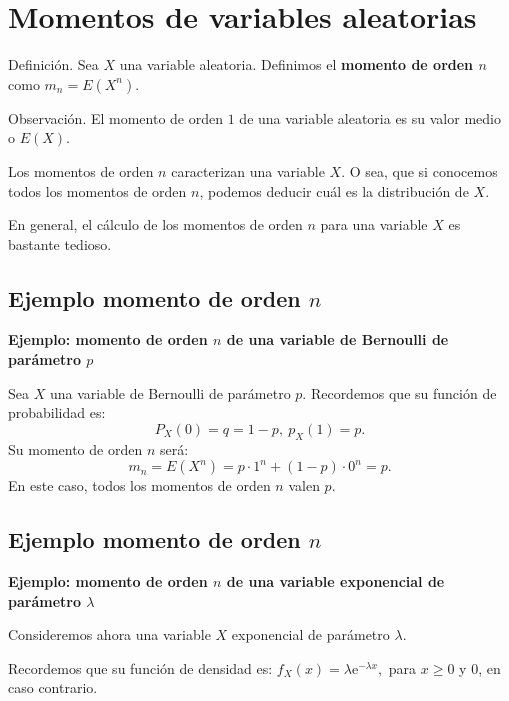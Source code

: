 \documentclass[]{book}
\begin{document}
\hypertarget{momentos-de-variables-aleatorias}{%
\section{Momentos de variables aleatorias}\label{momentos-de-variables-aleatorias}}

 Definición.
Sea \(X\) una variable aleatoria. Definimos el \textbf{momento de orden \(n\)} como
\(m_n = E\left(X^n\right)\).

 Observación.
El momento de orden \(1\) de una variable aleatoria es su valor medio o \(E(X)\).

Los momentos de orden \(n\) caracterizan una variable \(X\). O sea, que si conocemos todos los momentos de orden \(n\), podemos deducir cuál es la distribución de \(X\).

En general, el cálculo de los momentos de orden \(n\) para una variable \(X\) es bastante tedioso.

\hypertarget{ejemplo-momento-de-orden-n}{%
\subsection{\texorpdfstring{Ejemplo momento de orden \(n\)}{Ejemplo momento de orden n}}\label{ejemplo-momento-de-orden-n}}

\textbf{Ejemplo: momento de orden \(n\) de una variable de Bernoulli de parámetro \(p\)}

Sea \(X\) una variable de Bernoulli de parámetro \(p\). Recordemos que su función de probabilidad es:
\[
P_X(0)=q=1-p,\ p_X(1)=p.
\]
Su momento de orden \(n\) será:
\[
m_n = E\left(X^n\right)=p\cdot 1^n+(1-p)\cdot 0^n = p.
\]
En este caso, todos los momentos de orden \(n\) valen \(p\).

\hypertarget{ejemplo-momento-de-orden-n-1}{%
\subsection{\texorpdfstring{Ejemplo momento de orden \(n\)}{Ejemplo momento de orden n}}\label{ejemplo-momento-de-orden-n-1}}

\textbf{Ejemplo: momento de orden \(n\) de una variable exponencial de parámetro \(\lambda\)}

Consideremos ahora una variable \(X\) exponencial de parámetro \(\lambda\).

Recordemos que su función de densidad es: \(f_X(x)=\lambda \mathrm{e}^{-\lambda x},\) para \(x\geq 0\) y \(0\), en caso contrario.
\end{document}

